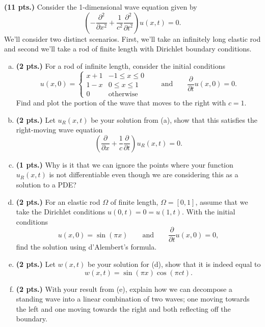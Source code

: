 \documentclass[12pt]{article} %
\begin{document}
\begin{problem}
\textbf{(11 pts.)} Consider the 1-dimensional wave equation given by
\[
\left(-\frac{\partial^2}{\partial x^2} +\frac{1}{c^2} \frac{\partial^2}{\partial  t^2} \right) u(x,t) = 0.
\]
We'll consider two distinct scenarios. First, we'll take an infinitely long elastic rod and second we'll take a rod of finite length with Dirichlet boundary conditions.
\begin{enumerate}[(a)]
    \item \textbf{(2 pts.)} For a rod of infinite length, consider the initial conditions
    \[
    u(x,0) = \begin{cases} x+1 & -1\leq x \leq 0 \\ 1-x & 0\leq x \leq 1 \\ 0 & \textrm{otherwise} \end{cases} \qquad \textrm{and} \qquad \frac{\partial}{\partial t} u(x,0) = 0.
    \]
    Find and plot the portion of the wave that moves to the right with $c=1$.
    \item \textbf{(2 pts.)} Let $u_R(x,t)$ be your solution from (a), show that this satisfies the right-moving wave equation
    \[
    \left(\frac{\partial}{\partial x} + \frac{1}{c} \frac{\partial}{\partial t} \right)u_R(x,t) = 0.
    \]
    \item \textbf{(1 pts.)} Why is it that we can ignore the points where your function $u_R(x,t)$ is not differentiable even though we are considering this as a solution to a PDE?
    \item \textbf{(2 pts.)} For an elastic rod $\Omega$ of finite length, $\Omega = [0,1]$, assume that we take the Dirichlet conditions $u(0,t)=0=u(1,t)$.  With the initial conditions
    \[
    u(x,0) = \sin(\pi x) \qquad \textrm{and} \qquad \frac{\partial}{\partial t} u(x,0)=0,
    \]
    find the solution using d'Alembert's formula.
    \item \textbf{(2 pts.)} Let $w(x,t)$ be your solution for (d), show that it is indeed equal to
    \[
    w(x,t) = \sin(\pi x)\cos(\pi c t).
    \]
    \item \textbf{(2 pts.)} With your result from (e), explain how we can decompose a standing wave into a linear combination of two waves; one moving towards the left and one moving towards the right and both reflecting off the boundary.
\end{enumerate}
\end{problem}
\end{document}
